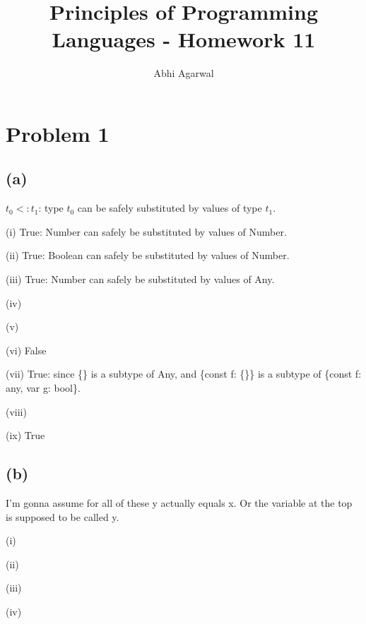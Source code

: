 \documentclass[11pt, oneside]{article}
\title{Principles of Programming Languages - Homework 11}
\author{Abhi Agarwal}
\date{}
\begin{document}
\maketitle
\section{Problem 1}
\subsection*{(a)} 

\indent \par $t_0 <: t_1$: type $t_0$ can be safely substituted by values of type $t_1$.
\par (i) True: Number can safely be substituted by values of Number.
\par (ii) True: Boolean can safely be substituted by values of Number. 
\par (iii) True: Number can safely be substituted by values of Any.
\par (iv) 
\par (v) 
\par (vi) False
\par (vii) True: since \{\} is a subtype of Any, and \{const f: \{\}\} is a subtype of \{const f: any, var g: bool\}.
\par (viii) 
\par (ix) True

\subsection*{(b)} 
\par I'm gonna assume for all of these y actually equals x. Or the variable at the top is supposed to be called y.
\par (i) 
\par (ii)  
\par (iii) 
\par (iv) 
\end{document}
